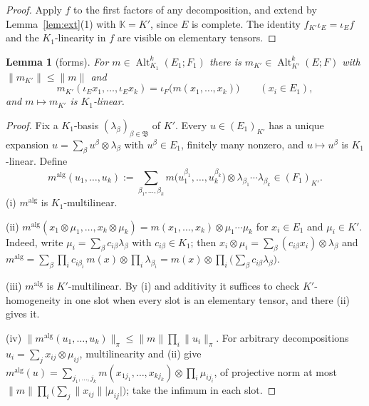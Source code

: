 \documentclass[11pt]{amsart}
\newtheorem{lemma}[theorem]{Lemma}
\theoremstyle{definition}
\theoremstyle{remark}
\numberwithin{equation}{section}
\newcommand{\Alt}{\operatorname{Alt}}
\newcommand{\abs}[1]{\lvert #1\rvert}
\newcommand{\norm}[1]{\lVert #1\rVert}
\begin{document}
\begin{proof}
Apply $f$ to the first factors of any decomposition, and extend by Lemma~\ref{lem:ext}(1) with $\mathbb K=K'$, since $E$ is
complete. The identity $f_{K'}\iota_E=\iota_Ef$ and the $K_1$\nobreakdash-linearity in $f$ are visible on elementary tensors.
\end{proof}

\begin{lemma}[forms]\label{lem:forms-bc}
For $m\in\Alt^k_{K_1}(E_1;F_1)$ there is $m_{K'}\in\Alt^k_{K'}(E;F)$ with $\norm{m_{K'}}\le\norm m$ and
\[
m_{K'}(\iota_Ex_1,\dots,\iota_Ex_k)=\iota_F\bigl(m(x_1,\dots,x_k)\bigr)\qquad(x_i\in E_1),
\]
and $m\mapsto m_{K'}$ is $K_1$\nobreakdash-linear.
\end{lemma}

\begin{proof}
Fix a $K_1$\nobreakdash-basis $(\lambda_\beta)_{\beta\in\mathfrak B}$ of $K'$. Every $u\in(E_1)_{K'}$ has a unique expansion
$u=\sum_\beta u^\beta\otimes\lambda_\beta$ with $u^\beta\in E_1$, finitely many nonzero, and $u\mapsto u^\beta$ is
$K_1$\nobreakdash-linear. Define
\[
m^{\mathrm{alg}}(u_1,\dots,u_k):=\sum_{\beta_1,\dots,\beta_k}m\bigl(u_1^{\beta_1},\dots,u_k^{\beta_k}\bigr)\otimes\lambda_{\beta_1}\cdots\lambda_{\beta_k}\in(F_1)_{K'} .
\]
\textup{(i)} $m^{\mathrm{alg}}$ is $K_1$\nobreakdash-multilinear.

\textup{(ii)} $m^{\mathrm{alg}}(x_1\otimes\mu_1,\dots,x_k\otimes\mu_k)=m(x_1,\dots,x_k)\otimes\mu_1\cdots\mu_k$ for $x_i\in E_1$ and
$\mu_i\in K'$. Indeed, write $\mu_i=\sum_\beta c_{i\beta}\lambda_\beta$ with $c_{i\beta}\in K_1$; then
$x_i\otimes\mu_i=\sum_\beta(c_{i\beta}x_i)\otimes\lambda_\beta$ and
$m^{\mathrm{alg}}=\sum_\beta\prod_ic_{i\beta_i}\,m(x)\otimes\prod_i\lambda_{\beta_i}=m(x)\otimes\prod_i\bigl(\sum_\beta c_{i\beta}\lambda_\beta\bigr)$.

\textup{(iii)} $m^{\mathrm{alg}}$ is $K'$\nobreakdash-multilinear. By \textup{(i)} and additivity it suffices to check $K'$\nobreakdash-homogeneity in
one slot when every slot is an elementary tensor, and there \textup{(ii)} gives it.

\textup{(iv)} $\norm{m^{\mathrm{alg}}(u_1,\dots,u_k)}_\pi\le\norm m\prod_i\norm{u_i}_\pi$. For arbitrary decompositions
$u_i=\sum_jx_{ij}\otimes\mu_{ij}$, multilinearity and \textup{(ii)} give
$m^{\mathrm{alg}}(u)=\sum_{j_1,\dots,j_k}m(x_{1j_1},\dots,x_{kj_k})\otimes\prod_i\mu_{ij_i}$, of projective norm at most
$\norm m\prod_i\bigl(\sum_j\norm{x_{ij}}\abs{\mu_{ij}}\bigr)$; take the infimum in each slot.


\end{proof}
\end{document}
